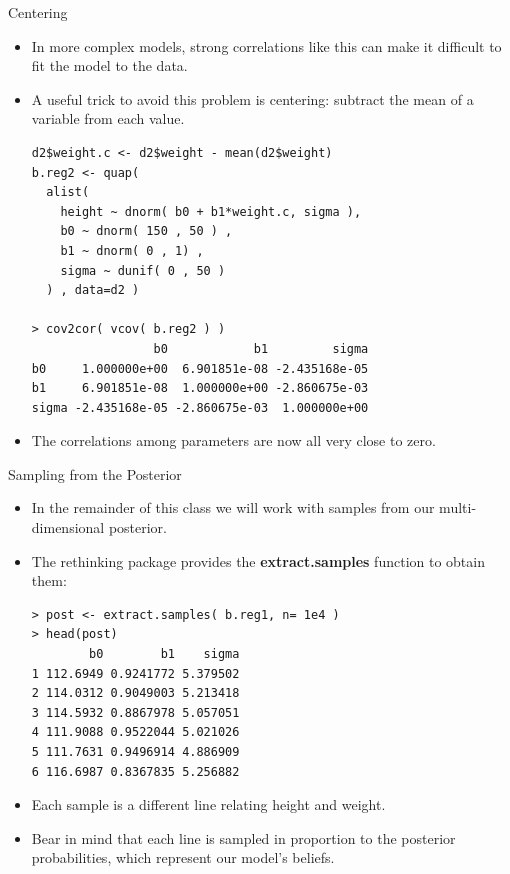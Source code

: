 \documentclass[handout]{beamer}
\begin{document}
\begin{frame}[fragile]{Centering}
\scriptsize{
\begin{itemize}
\item In more complex models, strong correlations like this can make it difficult to fit the model to the data. 

\item A useful trick to avoid this problem is  centering: subtract the mean of a variable from each value. 

\begin{verbatim}
d2$weight.c <- d2$weight - mean(d2$weight)
b.reg2 <- quap(
  alist(
    height ~ dnorm( b0 + b1*weight.c, sigma ),
    b0 ~ dnorm( 150 , 50 ) ,
    b1 ~ dnorm( 0 , 1) ,
    sigma ~ dunif( 0 , 50 )
  ) , data=d2 )

> cov2cor( vcov( b.reg2 ) )
                 b0            b1         sigma
b0     1.000000e+00  6.901851e-08 -2.435168e-05
b1     6.901851e-08  1.000000e+00 -2.860675e-03
sigma -2.435168e-05 -2.860675e-03  1.000000e+00  
\end{verbatim}

\item The correlations among parameters are now all very close to zero.

\end{itemize}
 

 
}
\end{frame}


\begin{frame}[fragile]{Sampling from the Posterior}
\scriptsize{
\begin{itemize}
\item In the remainder of this class we will work with samples from our multi-dimensional posterior.
\item The rethinking package provides the \textbf{extract.samples} function to obtain them:
\begin{verbatim}
> post <- extract.samples( b.reg1, n= 1e4 )
> head(post)
        b0        b1    sigma
1 112.6949 0.9241772 5.379502
2 114.0312 0.9049003 5.213418
3 114.5932 0.8867978 5.057051
4 111.9088 0.9522044 5.021026
5 111.7631 0.9496914 4.886909
6 116.6987 0.8367835 5.256882
\end{verbatim}

\item Each sample is a different line relating height and weight.

\item Bear in mind that each line is sampled in proportion to the posterior probabilities, which represent our model's beliefs.




\end{itemize}
 

 
}
\end{frame}
\end{document}
